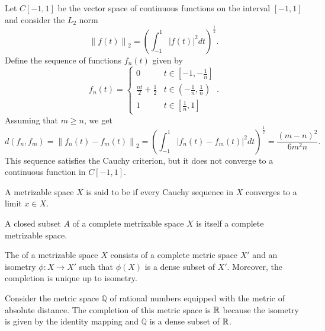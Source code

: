 \begin{example}
Let $C[-1,1]$ be the vector space of continuous functions on the interval $[-1,1]$ and consider the $L_2$ norm
\begin{equation*}
\left\| f(t) \right\|_2 = \left( \int_{-1}^1 |f(t)|^2 dt \right)^{\frac{1}{2}}.
\end{equation*}
Define the sequence of functions $f_n(t)$ given by
\begin{equation*}
f_n(t) = \left\{ \begin{array}{ll}
0 & t \in \left[ -1, -\frac{1}{n} \right] \\
\frac{nt}{2} + \frac{1}{2} & t \in \left( -\frac{1}{n}, \frac{1}{n} \right) \\
1 & t \in \left[ \frac{1}{n}, 1 \right]
\end{array} \right. .
\end{equation*}
Assuming that $m \geq n$, we get
\begin{equation*}
d(f_n, f_m) = \left\| f_n(t) - f_m(t) \right\|_2
= \left( \int_{-1}^1 |f_n(t) - f_m(t)|^2 dt \right)^{\frac{1}{2}}
= \frac{(m-n)^2}{6m^2n}.
\end{equation*}
This sequence satisfies the Cauchy criterion, but it does not converge to a continuous function in $C[-1,1]$.
\end{example}

\begin{definition}
A metrizable space $X$ is said to be  if every Cauchy sequence in $X$ converges to a limit $x \in X$.
\end{definition}

\begin{theorem}
A closed subset $A$ of a complete metrizable space $X$ is itself a complete metrizable space.
\end{theorem}

\begin{definition}
The  of a metrizable space $X$ consists of a complete metric space $X'$ and an isometry $\phi : X \rightarrow X'$ such that $\phi(X)$ is a dense subset of $X'$.
Moreover, the completion is unique up to isometry.
\end{definition}

\begin{example}
Consider the metric space $\mathbb{Q}$ of rational numbers equipped with the metric of absolute distance.
The completion of this metric space is $\mathbb{R}$ because the isometry is given by the identity mapping and $\mathbb{Q}$ is a dense subset of $\mathbb{R}$.
\end{example}


